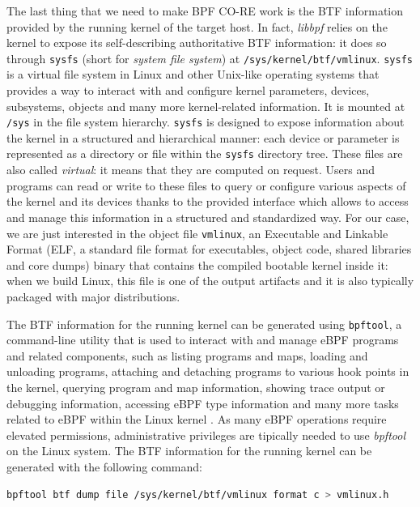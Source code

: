 The last thing that we need to make BPF CO-RE work is the BTF information provided by the running kernel of the target host.
In fact, \textit{libbpf} relies on the kernel to expose its self-describing authoritative BTF information: it does so through \verb|sysfs| (short for \textit{system file system}) at \verb|/sys/kernel/btf/vmlinux|.
\verb|sysfs| is a virtual file system in Linux and other Unix-like operating systems that provides a way to interact with and configure kernel parameters, devices, subsystems, objects and many more kernel-related information. 
It is mounted at \verb|/sys| in the file system hierarchy.
\verb|sysfs| is designed to expose information about the kernel in a structured and hierarchical manner: each device or parameter is represented as a directory or file within the \verb|sysfs| directory tree. 
These files are also called \textit{virtual}: it means that they are computed on request.
Users and programs can read or write to these files to query or configure various aspects of the kernel and its devices thanks to the provided interface which allows to access and manage this information in a structured and standardized way.
For our case, we are just interested in the object file \verb|vmlinux|, an Executable and Linkable Format (ELF, a standard file format for executables, object code, shared libraries and core dumps) binary that contains the compiled bootable kernel inside it: when we build Linux, this file is one of the output artifacts and it is also typically packaged with major distributions. 

The BTF information for the running kernel can be generated using \verb|bpftool|, a command-line utility that is used to interact with and manage eBPF programs and related components, such as listing programs and maps, loading and unloading programs, attaching and detaching programs to various hook points in the kernel, querying program and map information, showing trace output or debugging information, accessing eBPF type information and many more tasks related to eBPF within the Linux kernel \cite{bpftoolGitHubRepo}.
As many eBPF operations require elevated permissions, administrative privileges are tipically needed to use \textit{bpftool} on the Linux system.
The BTF information for the running kernel can be generated with the following command:

\begin{lstlisting}[language=bash, caption={vmlinux.h generation command}]
	bpftool btf dump file /sys/kernel/btf/vmlinux format c > vmlinux.h
\end{lstlisting}

